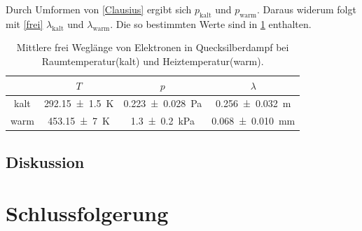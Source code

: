 \documentclass[
	a4paper,
	12pt,
	pagesize,
	ngerman
]{scrartcl}
\begin{document}
	Durch Umformen von \cref{Clausius} ergibt sich $p_\text{kalt}$ und $p_\text{warm}$.
	Daraus widerum folgt mit \cref{frei} $\lambda_\text{kalt}$ und $\lambda_\text{warm}$.
	Die so bestimmten Werte sind in \cref{TabelleFrei} enthalten.
	
	\begin{table}[H]
		\centering
		\begin{tabular}{ c | c | c | c }
			&$T$ & $p$ &  $\lambda$ \\ \hline
			kalt&\SI{292.15 +- 1,5}{K} &\SI{0,223+-0,028}{Pa} &  \SI{0,256+- 0,032}{m} \\
			warm&\SI{453.15+- 7}{K} & \SI{1,3+-0,2}{kPa} & \SI{0,068 +- 0,010}{mm} \\
		\end{tabular}
		\caption{Mittlere frei Weglänge von Elektronen in Quecksilberdampf bei Raumtemperatur(kalt) und Heiztemperatur(warm).}
		\label{TabelleFrei} 
	\end{table}
	
	
	
	\subsection{Diskussion}
	
	

	
	
	
	
	
	
	
	\section{Schlussfolgerung}
	
	\printbibliography
\end{document}
